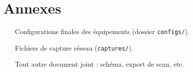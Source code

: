 \documentclass[11pt,a4paper]{article}
\begin{document}
\section{Annexes}

\begin{itemize}
  \item [Configurations finales des équipements (dossier \texttt{configs/}).]
  \item [Fichiers de capture réseau (\texttt{captures/}).]
  \item [Tout autre document joint : schéma, export de scan, etc.]
\end{itemize}
\end{document}
